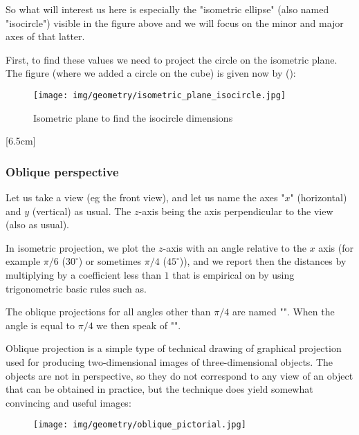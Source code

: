 \begin{itemize}
		So what will interest us here is especially the "isometric ellipse" (also named "isocircle") visible in the figure above and we will focus on the minor and major axes of that latter. 
		
		First, to find these values we need to project the circle on the isometric plane. The figure (where we added a circle on the cube) is given now by ():
		\begin{figure}[H]
			\centering
			\texttt{[image: img/geometry/isometric\_plane\_isocircle.jpg]}
			\caption{Isometric plane to find the isocircle dimensions}
		\end{figure}
		[6.5cm]
		
	\end{itemize}
	
	\subsubsection{Oblique perspective}
	Let us take a view (eg the front view), and let us name the axes "$x$" (horizontal) and $y$ (vertical) as usual. The $z$-axis being the axis perpendicular to the view (also as usual).

	In isometric projection, we plot the $z$-axis with an angle relative to the $x$ axis (for example $\pi/6$ ($30^\circ$) or sometimes $\pi/4$ ($45^\circ$)), and we report then the distances by multiplying by a coefficient less than $1$ that is empirical on by using trigonometric basic rules such as.
	\begin{tcolorbox}[title=Remark,colframe=black,arc=10pt]
	The oblique projections for all angles other than $\pi/4$ are named "". When the angle is equal to $\pi/4$ we then speak of "".	
	\end{tcolorbox}
	
	Oblique projection is a simple type of technical drawing of graphical projection used for producing two-dimensional images of three-dimensional objects. The objects are not in perspective, so they do not correspond to any view of an object that can be obtained in practice, but the technique does yield somewhat convincing and useful images:
	\begin{figure}[H]
		\centering
		\texttt{[image: img/geometry/oblique\_pictorial.jpg]}
	\end{figure}

